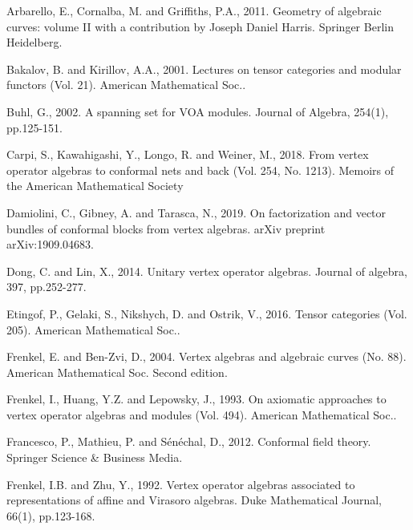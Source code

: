 \documentclass[11pt,b5paper,notitlepage]{article}
\theoremstyle{definition}
\theoremstyle{plain}
\numberwithin{equation}{section}
\begin{document}
\printindex	
	\begin{thebibliography}{999999}
		\footnotesize	


Arbarello, E., Cornalba, M. and Griffiths, P.A., 2011. Geometry of algebraic curves: volume II with a contribution by Joseph Daniel Harris. Springer Berlin Heidelberg.



Bakalov, B. and Kirillov, A.A., 2001. Lectures on tensor categories and modular functors (Vol. 21). American Mathematical Soc..



Buhl, G., 2002. A spanning set for VOA modules. Journal of Algebra, 254(1), pp.125-151.		


Carpi, S., Kawahigashi, Y., Longo, R. and Weiner, M., 2018. From vertex operator algebras to conformal nets and back (Vol. 254, No. 1213). Memoirs of the American Mathematical Society


Damiolini, C., Gibney, A. and Tarasca, N., 2019. On factorization and vector bundles of conformal blocks from vertex algebras. arXiv preprint arXiv:1909.04683.


Dong, C. and Lin, X., 2014. Unitary vertex operator algebras. Journal of algebra, 397, pp.252-277.
	
		
		


Etingof, P., Gelaki, S., Nikshych, D. and Ostrik, V., 2016. Tensor categories (Vol. 205). American Mathematical Soc..



Frenkel, E. and Ben-Zvi, D., 2004. Vertex algebras and algebraic curves (No. 88). American Mathematical Soc. Second edition.


Frenkel, I., Huang, Y.Z. and Lepowsky, J., 1993. On axiomatic approaches to vertex operator algebras and modules (Vol. 494). American Mathematical Soc..



Francesco, P., Mathieu, P. and Sénéchal, D., 2012. Conformal field theory. Springer Science \& Business Media.

Frenkel, I.B. and Zhu, Y., 1992. Vertex operator algebras associated to representations of affine and Virasoro algebras. Duke Mathematical Journal, 66(1), pp.123-168.


\end{thebibliography}
\end{document}
